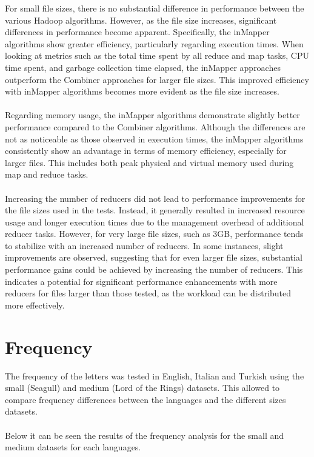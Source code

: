 For small file sizes, there is no substantial difference in performance between the various Hadoop algorithms. However,
as the file size increases, significant differences in performance become apparent. Specifically, the inMapper algorithms
show greater efficiency, particularly regarding execution times. When looking at metrics such as the total time spent by
all reduce and map tasks, CPU time spent, and garbage collection time elapsed, the inMapper approaches outperform the
Combiner approaches for larger file sizes. This improved efficiency with inMapper algorithms becomes more evident
as the file size increases.\\ \\
Regarding memory usage, the inMapper algorithms demonstrate slightly better performance compared to the Combiner algorithms.
Although the differences are not as noticeable as those observed in execution times, the inMapper algorithms consistently
show an advantage in terms of memory efficiency, especially for larger files. This includes both peak physical and virtual
memory used during map and reduce tasks.\\ \\
Increasing the number of reducers did not lead to performance improvements for the file sizes used in the tests. Instead,
it generally resulted in increased resource usage and longer execution times due to the management overhead of additional reducer tasks.
However, for very large file sizes, such as 3GB, performance tends to stabilize with an increased number of reducers.
In some instances, slight improvements are observed, suggesting that for even larger file sizes, substantial performance gains could be achieved
by increasing the number of reducers. This indicates a potential for significant performance enhancements with more reducers for files
larger than those tested, as the workload can be distributed more effectively.

\newpage

\section{Frequency}
The frequency of the letters was tested in English, Italian and Turkish using the small (Seagull) and medium (Lord of the Rings) datasets. 
This allowed to compare frequency differences between the languages and the different sizes datasets.\\ \\
Below it can be seen the results of the frequency analysis for the small and medium datasets for each languages.

